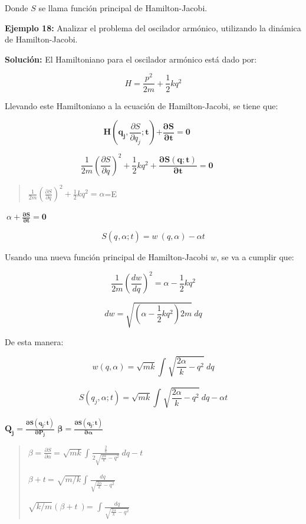 \documentclass[]{article}
\begin{document}
Donde \(S\) se llama función principal de Hamilton-Jacobi.

\textbf{Ejemplo 18:} Analizar el problema del oscilador armónico,
utilizando la dinámica de Hamilton-Jacobi.

\textbf{Solución:} El Hamiltoniano para el oscilador armónico está dado
por:

\[H = \frac{p^{2}}{2m} + \frac{1}{2}kq^{2}\]

Llevando este Hamiltoniano a la ecuación de Hamilton-Jacobi, se tiene
que:

\[\mathbf{H}\left( \mathbf{q}_{\mathbf{j}}\mathbf{,}\frac{\partial S}{\partial q_{j}}\mathbf{;t} \right)\mathbf{+}\frac{\mathbf{\partial S}}{\mathbf{\partial t}}\mathbf{= 0\ \ \ \ \ \ \ }\]

\[\frac{1}{2m}\left( \frac{\partial S}{\partial q} \right)^{2} + \frac{1}{2}kq^{2} + \frac{\mathbf{\partial S(q;t)}}{\mathbf{\partial t}}\mathbf{= 0\ \ \ \ \ \ \ }\]

\begin{quote}
\(\frac{1}{2m}\left( \frac{\partial S}{\partial q} \right)^{2} + \frac{1}{2}kq^{2} = \alpha\)=E
\end{quote}

\(\mathbf{\ }\alpha + \frac{\mathbf{\partial S}}{\mathbf{\partial t}}\mathbf{= 0\ \ \ \ \ \ \ }\)

\[S\left( q_{},\alpha;t \right) = w\ (q,\alpha) - \alpha t\]

Usando una nueva función principal de Hamilton-Jacobi \(w\), se va a
cumplir que:

\[\frac{1}{2m}\left( \frac{dw}{dq} \right)^{2} = \alpha - \frac{1}{2}kq^{2}\]

\[dw = \sqrt{\left( \alpha - \frac{1}{2}kq^{2} \right)2m}\ dq\]

De esta manera:

\[w(q,\alpha) = \sqrt{mk}\int_{}^{}\sqrt{\frac{2\alpha}{k} - q^{2}}\ dq\]

\[S\left( q_{j},\alpha;t \right) = \sqrt{mk}\int_{}^{}\sqrt{\frac{2\alpha}{k} - q^{2}}\ dq - \alpha t\]

\(\mathbf{Q}_{\mathbf{j}}\mathbf{=}\frac{\mathbf{\partial S}\left( \mathbf{q}_{\mathbf{j}}\mathbf{;t} \right)}{\mathbf{\partial}\mathbf{P}_{\mathbf{j}}}\)
\(\mathbf{\beta =}\frac{\mathbf{\partial S}\left( \mathbf{q}_{\mathbf{j}}\mathbf{;t} \right)}{\mathbf{\partial\alpha}}\)

\begin{quote}
\(\beta = \frac{\partial S}{\partial\alpha}\ \)=
\(\sqrt{mk}\int_{}^{}\frac{\frac{2}{k}}{2\sqrt{\frac{2\alpha}{k} - q^{2}}}\ dq - t\)

\(\beta + t\ \)=
\(\sqrt{m/k}\int_{}^{}\frac{dq}{\sqrt{\frac{2\alpha}{k} - q^{2}}}\ \)

\(\sqrt{k/m}(\beta + t\ )\)=
\(\int_{}^{}\frac{dq}{\sqrt{\frac{2\alpha}{k} - q^{2}}}\ \)
\end{quote}
\end{document}
